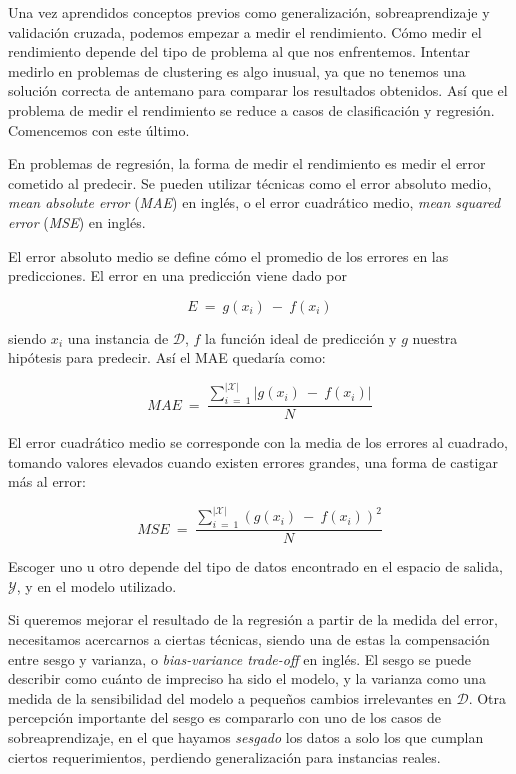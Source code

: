 Una vez aprendidos conceptos previos como generalización, sobreaprendizaje y validación cruzada, podemos empezar a medir el rendimiento. Cómo medir el rendimiento depende del tipo de problema al que nos enfrentemos. Intentar medirlo en problemas de clustering es algo inusual, ya que no tenemos una solución correcta de antemano para comparar los resultados obtenidos. Así que el problema de medir el rendimiento se reduce a casos de clasificación y regresión. Comencemos con este último.

En problemas de regresión, la forma de medir el rendimiento es medir el error cometido al predecir. Se pueden utilizar técnicas como el error absoluto medio, \emph{mean absolute error} (\emph{MAE}) en inglés, o el error cuadrático medio, \emph{mean squared error} (\emph{MSE}) en inglés.

El error absoluto medio se define cómo el promedio de los errores en las predicciones. El error en una predicción viene dado por

$$
E\:=\:g(x_{i})\:-\:f(x_{i})
$$

\noindent
siendo $x_{i}$ una instancia de $\mathcal{D}$, $f$ la función ideal de predicción y $g$ nuestra hipótesis para predecir. Así el MAE quedaría como:

$$
MAE\:=\:\frac{\sum_{i\:=\:1}^{|\mathcal{X}|}|g(x_{i})\:-\:f(x_{i})|}{N}
$$

El error cuadrático medio se corresponde con la media de los errores al cuadrado, tomando valores elevados cuando existen errores grandes, una forma de castigar más al error:

$$
MSE\:=\:\frac{\sum_{i\:=\:1}^{|\mathcal{X}|}(g(x_{i})\:-\:f(x_{i}))^{2}}{N}
$$

Escoger uno u otro depende del tipo de datos encontrado en el espacio de salida, $\mathcal{Y}$, y en el modelo utilizado.

Si queremos mejorar el resultado de la regresión a partir de la medida del error, necesitamos acercarnos a ciertas técnicas, siendo una de estas la compensación entre sesgo y varianza, o \emph{bias-variance trade-off} en inglés. El sesgo se puede describir como cuánto de impreciso ha sido el modelo, y la varianza como una medida de la sensibilidad del modelo a pequeños cambios irrelevantes en $\mathcal{D}$. Otra percepción importante del sesgo es compararlo con uno de los casos de sobreaprendizaje, en el que hayamos \emph{sesgado} los datos a solo los que cumplan ciertos requerimientos, perdiendo generalización para instancias reales.


